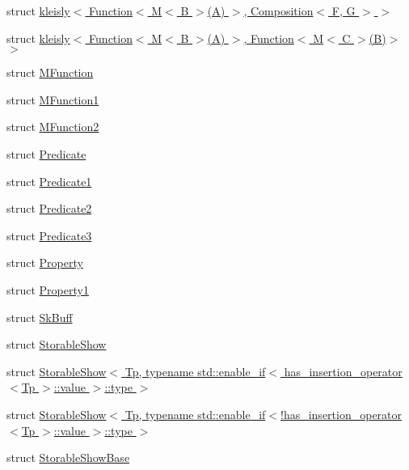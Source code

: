 \begin{DoxyCompactItemize}
\item 
struct \hyperlink{structpfq__lang_1_1kleisly_3_01Function_3_01M_3_01B_01_4_07A_08_01_4_00_01Composition_3_01F_00_01G_01_4_01_4}{kleisly$<$ Function$<$ M$<$ B $>$(\+A) $>$, Composition$<$ F, G $>$ $>$}
\item 
struct \hyperlink{structpfq__lang_1_1kleisly_3_01Function_3_01M_3_01B_01_4_07A_08_01_4_00_01Function_3_01M_3_01C_01_4_07B_08_4_01_4}{kleisly$<$ Function$<$ M$<$ B $>$(\+A) $>$, Function$<$ M$<$ C $>$(\+B)$>$ $>$}
\item 
struct \hyperlink{structpfq__lang_1_1MFunction}{M\+Function}
\item 
struct \hyperlink{structpfq__lang_1_1MFunction1}{M\+Function1}
\item 
struct \hyperlink{structpfq__lang_1_1MFunction2}{M\+Function2}
\item 
struct \hyperlink{structpfq__lang_1_1Predicate}{Predicate}
\item 
struct \hyperlink{structpfq__lang_1_1Predicate1}{Predicate1}
\item 
struct \hyperlink{structpfq__lang_1_1Predicate2}{Predicate2}
\item 
struct \hyperlink{structpfq__lang_1_1Predicate3}{Predicate3}
\item 
struct \hyperlink{structpfq__lang_1_1Property}{Property}
\item 
struct \hyperlink{structpfq__lang_1_1Property1}{Property1}
\item 
struct \hyperlink{structpfq__lang_1_1SkBuff}{Sk\+Buff}
\item 
struct \hyperlink{structpfq__lang_1_1StorableShow}{Storable\+Show}
\item 
struct \hyperlink{structpfq__lang_1_1StorableShow_3_01Tp_00_01typename_01std_1_1enable__if_3_01has__insertion__ope410294f2cbdf117d0cfbbeb13476ebf1}{Storable\+Show$<$ Tp, typename std\+::enable\+\_\+if$<$ has\+\_\+insertion\+\_\+operator$<$\+Tp $>$\+::value $>$\+::type $>$}
\item 
struct \hyperlink{structpfq__lang_1_1StorableShow_3_01Tp_00_01typename_01std_1_1enable__if_3_9has__insertion__operc98e9de6b381c730d9d28da7df10d016}{Storable\+Show$<$ Tp, typename std\+::enable\+\_\+if$<$!has\+\_\+insertion\+\_\+operator$<$\+Tp $>$\+::value $>$\+::type $>$}
\item 
struct \hyperlink{structpfq__lang_1_1StorableShowBase}{Storable\+Show\+Base}
\end{DoxyCompactItemize}
